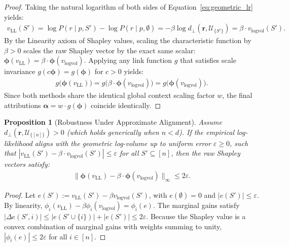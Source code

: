 \documentclass{article}
\newtheorem{proposition}{Proposition}
\begin{document}
\begin{proof}
Taking the natural logarithm of both sides of Equation~\eqref{eq:geometric_lr} yields:
\begin{align*}
    v_{\text{LL}}(S') = \log P(r \mid p, S') - \log P(r \mid p, \emptyset) = -\beta \log d_{\perp}(\mathbf{r}, \mathcal{U}_{\{S'\}}) = \beta \cdot v_{\text{logvol}}(S').
\end{align*}
By the Linearity axiom of Shapley values, scaling the characteristic function by $\beta > 0$ scales the raw Shapley vector by the exact same scalar: $\boldsymbol{\phi}(v_{\text{LL}}) = \beta \cdot \boldsymbol{\phi}(v_{\text{logvol}})$. Applying any link function $g$ that satisfies scale invariance $g(c\boldsymbol{\phi}) = g(\boldsymbol{\phi})$ for $c > 0$ yields:
\begin{align*}
    g\big(\boldsymbol{\phi}(v_{\text{LL}})\big) = g\big(\beta \cdot \boldsymbol{\phi}(v_{\text{logvol}})\big) = g\big(\boldsymbol{\phi}(v_{\text{logvol}})\big).
\end{align*}
Since both methods share the identical global context scaling factor $w$, the final attributions $\boldsymbol{\alpha} = w \cdot g(\boldsymbol{\phi})$ coincide identically.
\end{proof}

\begin{proposition}[Robustness Under Approximate Alignment]\label{prop:approx_equivalence}
Assume $d_{\perp}(\mathbf{r}, \mathcal{U}_{\{[n]\}}) > 0$ (which holds generically when $n < d$). If the empirical log-likelihood aligns with the geometric log-volume up to uniform error $\varepsilon \ge 0$, such that $|v_{\text{LL}}(S') - \beta \cdot v_{\text{logvol}}(S')| \le \varepsilon$ for all $S' \subseteq [n]$, then the raw Shapley vectors satisfy:
\begin{align}
    \big\| \boldsymbol{\phi}(v_{\text{LL}}) - \beta \cdot \boldsymbol{\phi}(v_{\text{logvol}}) \big\|_\infty \le 2\varepsilon.
\end{align}
\end{proposition}

\begin{proof}
Let $e(S') := v_{\text{LL}}(S') - \beta v_{\text{logvol}}(S')$, with $e(\emptyset) = 0$ and $|e(S')| \le \varepsilon$. By linearity, $\phi_i(v_{\text{LL}}) - \beta \phi_i(v_{\text{logvol}}) = \phi_i(e)$. The marginal gains satisfy $|\Delta e(S', i)| \le |e(S' \cup \{i\})| + |e(S')| \le 2\varepsilon$. Because the Shapley value is a convex combination of marginal gains with weights summing to unity, $|\phi_i(e)| \le 2\varepsilon$ for all $i \in [n]$.
\end{proof}
\end{document}
